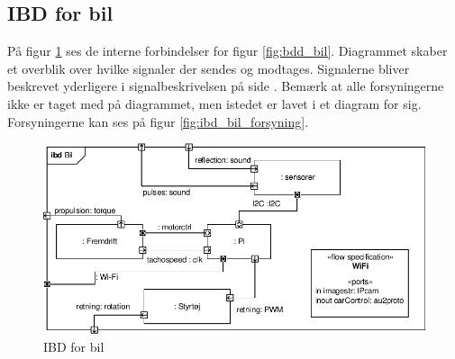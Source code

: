 \subsection{IBD for bil} %

På figur \ref{fig:ibd_bil} ses de interne forbindelser for figur \ref{fig:bdd_bil}. Diagrammet skaber et overblik over hvilke signaler der sendes og modtages. Signalerne bliver beskrevet yderligere i signalbeskrivelsen på side \pageref{sec:signalbeskrivelse}. Bemærk at alle forsyningerne ikke er taget med på diagrammet, men istedet er lavet i et diagram for sig. Forsyningerne kan ses på figur \ref{fig:ibd_bil_forsyning}.

\begin{figure}[h]
\centering
\includegraphics[scale=1]{../fig/diagrammer/bil/ibd_bil.pdf}
\caption{IBD for bil}
\label{fig:ibd_bil}
\end{figure}